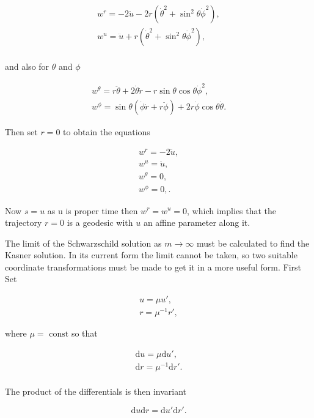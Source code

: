 \begin{align*}
w^{r} = -2 \ddot{u} - 2 r(\dot{\theta}^2 + \sin^2{\theta}\dot{\phi}^2), \\
w^{u} = \ddot{u} + r(\dot{\theta}^2 + \sin^2{\theta}\dot{\phi}^2), \\
\end{align*}

\noindent and also for $\theta$ and $\phi$

\begin{align*}
w^{\theta} = r \ddot{\theta} + 2 \dot{\theta} \dot{r} - r \sin{\theta}\cos{\theta}\dot{\phi}^2, \\
w^{\phi} = \sin{\theta}(\dot{\phi} \dot{r} + r \ddot{\phi}) + 2r \dot{\phi}\cos{\theta} \dot{\theta}.
\end{align*}

\noindent Then set $r=0$ to obtain the equations

\begin{align*} 
w^{r} = - 2 \ddot{u}, \\
w^{u} = \ddot{u}, \\
w^{\theta} = 0, \\
w^{\phi} = 0,.
\end{align*} 

\noindent Now $s = u$ as u is proper time then $w^{r} = w^{u} = 0$, which implies that the trajectory $r=0$ is a geodesic with $u$ an affine parameter along it. 

The limit of the Schwarzschild solution as $m \rightarrow \infty$ must be calculated to find the Kasner solution. In its current form the limit cannot be taken, so two suitable coordinate transformations must be made to get it in a more useful form. First Set 

\begin{gather*} 
u = \mu u', \\
r = {\mu}^{-1} r',   
\end{gather*} 

\noindent where $\mu = \text{ const}$ so that
  
\begin{gather*} 
\mathrm{d}u = \mu \mathrm{d}u', \\
\mathrm{d}r = {\mu}^{-1} \mathrm{d}r'. \\
\end{gather*} 

\noindent The product of the differentials is then invariant

\begin{equation*}
{\mathrm{d}u}{\mathrm{d}r} = {\mathrm{d}u'}{\mathrm{d}r'}. 
\end{equation*}

